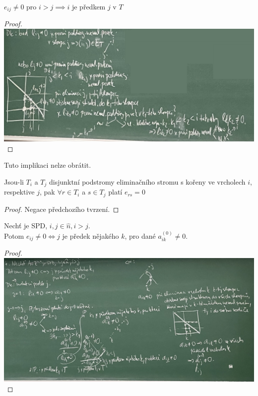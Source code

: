 \documentclass[../main.tex]{subfiles}
\begin{document}
\begin{claim}
$e_{ij}\neq 0$ pro $i>j \implies i$ je předkem $j$ v $T$
\end{claim}
\begin{proof}
    \hphantom{text}

        \includegraphics[width=0.9\linewidth]{images/19-10-dukaz2.jpg}
\end{proof}

\begin{remark}
    Tuto implikaci nelze obrátit.
\end{remark}
\begin{claim}
Jsou-li $T_i$ a $T_j$ disjunktní podstromy eliminačního stromu s kořeny ve vrcholech $i$, respektive $j$,
pak $\forall r \in T_i$ a $s\in T_j$ platí $e_{rs} = 0$
\end{claim}
\begin{proof}
    Negace předchozího tvrzení. 
\end{proof}


\begin{claim}
    Nechť \matAsquare je SPD, $i,j\in\hat{n}, i>j$.\\
    Potom $e_{ij} \neq 0 \Leftrightarrow j$ je předek 
    nějakého $k$, pro dané $a_{ik}^{(0)}\neq 0$.
\end{claim}
\begin{proof}
    \hphantom{text}

    \includegraphics[width=0.9\linewidth]{images/19-10-dukaz4.jpg}
\end{proof}
\end{document}
